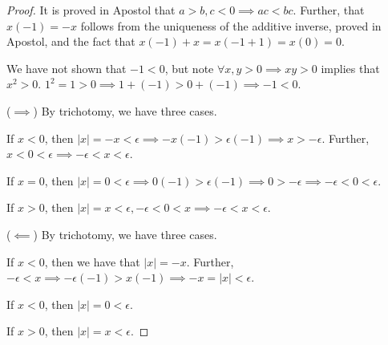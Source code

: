 \documentclass[12pt,letterpaper]{article}
\theoremstyle{definition}
\begin{document}
\begin{proof}
    It is proved in Apostol that $a > b, c < 0 \implies ac < bc$.
    Further, that $x(-1) = -x$ follows from the uniqueness of the additive inverse,
    proved in Apostol, and the fact that $x(-1) + x = x(-1 + 1) = x(0) = 0$.

    We have not shown that $-1 < 0$, but note $\forall x,y > 0 \implies xy > 0$ implies that
    $x^2 > 0$. $1^2 = 1 > 0 \implies 1 + (-1) > 0 + (-1) \implies -1 < 0$.

    ($\implies$) By trichotomy, we have three cases.
    
    If $x < 0$, then $|x| = -x < \epsilon \implies -x(-1) > \epsilon(-1) \implies x > -\epsilon$.
    Further, $x < 0 < \epsilon \implies -\epsilon < x < \epsilon$.

    If $x = 0$, then $|x| = 0 < \epsilon \implies 0(-1) > \epsilon(-1) \implies 0 > -\epsilon \implies -\epsilon < 0 < \epsilon$.

    If $x > 0$, then $|x| = x < \epsilon, -\epsilon < 0 < x \implies -\epsilon < x < \epsilon$.

    ($\impliedby$) By trichotomy, we have three cases.

    If $x < 0$, then we have that $|x| = -x$. 
    Further, $-\epsilon < x \implies -\epsilon(-1) > x(-1) \implies -x = |x| < \epsilon$.

    If $x < 0$, then $|x| = 0 < \epsilon$.

    If $x > 0$, then $|x| = x < \epsilon$.
\end{proof}
\end{document}
